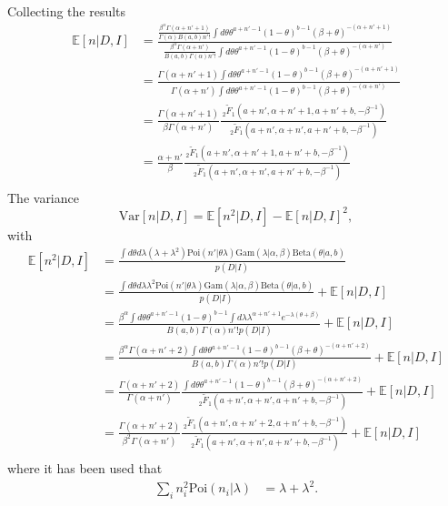 Collecting the results
\begin{equation}
	\begin{split}
		\mathbb{E}[n|D,I] &=\frac{\frac{\beta^\alpha\Gamma(\alpha+n'+1)}{\Gamma(\alpha)B(a,b)n'!}\int d\theta\theta^{a+n'-1}(1-\theta)^{b-1} (\beta+\theta)^{-(\alpha+n'+1)}}{\frac{\beta^\alpha\Gamma(\alpha+n')}{B(a,b)\Gamma(\alpha)n'!}\int d\theta \theta^{a+n'-1}(1-\theta)^{b-1} (\beta+\theta)^{-(\alpha+n')}}\\
		&=\frac{\Gamma(\alpha+n'+1)\int d\theta\theta^{a+n'-1}(1-\theta)^{b-1} (\beta+\theta)^{-(\alpha+n'+1)}}{\Gamma(\alpha+n')\int d\theta \theta^{a+n'-1}(1-\theta)^{b-1} (\beta+\theta)^{-(\alpha+n')}}\\
		&=\frac{\Gamma(\alpha+n'+1)}{\beta\Gamma(\alpha+n')}\frac{ \,_2\tilde{F}_1(a+n',\alpha+n'+1,a+n'+b,-\beta^{-1})}{\,_2\tilde{F}_1(a+n',\alpha+n',a+n'+b,-\beta^{-1})}\\
		&=\frac{\alpha+n'}{\beta}\frac{ \,_2\tilde{F}_1(a+n',\alpha+n'+1,a+n'+b,-\beta^{-1})}{\,_2\tilde{F}_1(a+n',\alpha+n',a+n'+b,-\beta^{-1})}\\
	\end{split}
	\label{e3}
\end{equation}
The variance 
\begin{equation}
	\text{Var}[n|D,I] = \mathbb{E}[n^2|D,I]-\mathbb{E}[n|D,I]^2,
\end{equation}
with
\begin{equation}
	\begin{split}
		\mathbb{E}[n^2|D,I] &=\frac{\int d\theta d\lambda (\lambda+\lambda^2)\text{Poi}(n'|\theta\lambda)\text{Gam}(\lambda|\alpha,\beta)\text{Beta}(\theta|a,b)}{p(D|I)}\\
		&=\frac{\int d\theta d\lambda \lambda^2\text{Poi}(n'|\theta\lambda)\text{Gam}(\lambda|\alpha,\beta)\text{Beta}(\theta|a,b)}{p(D|I)}+\mathbb{E}[n|D,I]\\
		&=\frac{\beta^\alpha\int d\theta\theta^{a+n'-1}(1-\theta)^{b-1} \int d\lambda \lambda^{\alpha+n'+1}e^{-\lambda(\theta+\beta)} }{B(a,b)\Gamma(\alpha)n'!p(D|I)}+\mathbb{E}[n|D,I]\\
		&=\frac{\beta^\alpha\Gamma(\alpha+n'+2)\int d\theta\theta^{a+n'-1}(1-\theta)^{b-1} (\beta+\theta)^{-(\alpha+n'+2)} }{B(a,b)\Gamma(\alpha)n'!p(D|I)}+\mathbb{E}[n|D,I]\\
		&=\frac{\Gamma(\alpha+n'+2)}{\Gamma(\alpha+n')}\frac{\int d\theta\theta^{a+n'-1}(1-\theta)^{b-1} (\beta+\theta)^{-(\alpha+n'+2)} }{\,_2\tilde{F}_1(a+n',\alpha+n',a+n'+b,-\beta^{-1})}+\mathbb{E}[n|D,I]\\
		&=\frac{\Gamma(\alpha+n'+2)}{\beta^2\Gamma(\alpha+n')}\frac{\,_2\tilde{F}_1(a+n',\alpha+n'+2,a+n'+b,-\beta^{-1}) }{\,_2\tilde{F}_1(a+n',\alpha+n',a+n'+b,-\beta^{-1})}+\mathbb{E}[n|D,I]\\
	\end{split}
\end{equation}
where it has been used that
\begin{equation}
	\begin{split}
		\sum_in_i^2\text{Poi}(n_i|\lambda)&=\lambda+\lambda^2.\\
	\end{split}
\end{equation}

